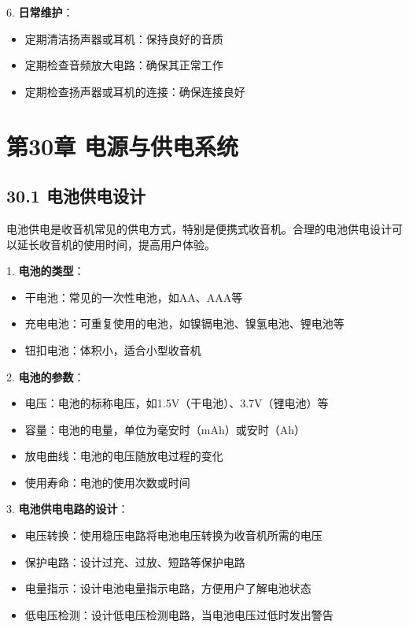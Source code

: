 \documentclass[12pt,UTF8]{ctexbook}
\begin{document}
6. \textbf{日常维护}：
   \begin{itemize}[leftmargin=3.5em]
   \item 定期清洁扬声器或耳机：保持良好的音质
   \item 定期检查音频放大电路：确保其正常工作
   \item 定期检查扬声器或耳机的连接：确保连接良好
   \end{itemize}

\chapter*{第30章 电源与供电系统}
\section*{30.1 电池供电设计}

电池供电是收音机常见的供电方式，特别是便携式收音机。合理的电池供电设计可以延长收音机的使用时间，提高用户体验。

1. \textbf{电池的类型}：
   \begin{itemize}[leftmargin=3.5em]
   \item 干电池：常见的一次性电池，如AA、AAA等
   \item 充电电池：可重复使用的电池，如镍镉电池、镍氢电池、锂电池等
   \item 钮扣电池：体积小，适合小型收音机
   \end{itemize}

2. \textbf{电池的参数}：
   \begin{itemize}[leftmargin=3.5em]
   \item 电压：电池的标称电压，如1.5V（干电池）、3.7V（锂电池）等
   \item 容量：电池的电量，单位为毫安时（mAh）或安时（Ah）
   \item 放电曲线：电池的电压随放电过程的变化
   \item 使用寿命：电池的使用次数或时间
   \end{itemize}

3. \textbf{电池供电电路的设计}：
   \begin{itemize}[leftmargin=3.5em]
   \item 电压转换：使用稳压电路将电池电压转换为收音机所需的电压
   \item 保护电路：设计过充、过放、短路等保护电路
   \item 电量指示：设计电池电量指示电路，方便用户了解电池状态
   \item 低电压检测：设计低电压检测电路，当电池电压过低时发出警告
   \end{itemize}
\end{document}
